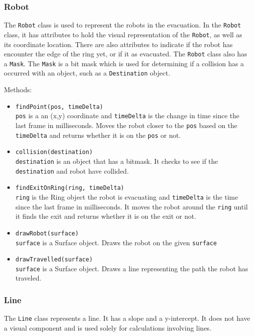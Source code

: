 \documentclass[12pt,letterpaper]{article}
\begin{document}
    \subsubsection{Robot}
        The \texttt{Robot} class is used to represent the robots in the evacuation. In the \texttt{Robot} class, it has attributes to hold the visual representation of the \texttt{Robot}, as well as its coordinate location. There are also attributes to indicate if the robot has encounter the edge of the ring yet, or if it as evacuated. The \texttt{Robot} class also has a \texttt{Mask}. The \texttt{Mask} is a bit mask which is used for determining if a collision has a occurred with an object, such as a \texttt{Destination} object.
        
        \noindent Methods:
        \begin{itemize}
            \item \texttt{findPoint(pos, timeDelta)} \\
                \texttt{pos} is a an (x,y) coordinate and \texttt{timeDelta} is the change in time since the last frame in milliseconds. Moves the robot closer to the \texttt{pos} based on the \texttt{timeDelta} and returns whether it is on the \texttt{pos} or not.
            \item \texttt{collision(destination)} \\
                \texttt{destination} is an object that has a bitmask. It checks to see if the \texttt{destination} and robot have collided.
            \item \texttt{findExitOnRing(ring, timeDelta)} \\
                \texttt{ring} is the Ring object the robot is evacuating and \texttt{timeDelta} is the time since the last frame in milliseconds. It moves the robot around the \texttt{ring} until it finds the exit and returns whether it is on the exit or not.
            \item \texttt{drawRobot(surface)} \\
                \texttt{surface} is a Surface object. Draws the robot on the given \texttt{surface}
            \item \texttt{drawTravelled(surface)} \\
                \texttt{surface} is a Surface object. Draws a line representing the path the robot has traveled.
        \end{itemize}

    \subsubsection{Line}
        The \texttt{Line} class represents a line. It has a slope and a y-intercept. It does not have a visual component and is used solely for calculations involving lines.
    
\end{document}
